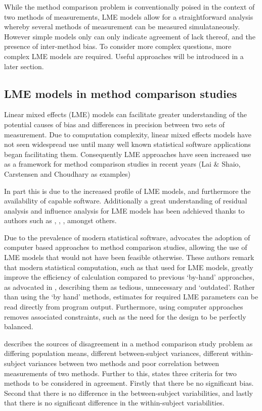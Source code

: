 \documentclass[12pt, a4paper]{report}
\theoremstyle{plain}
\theoremstyle{definition}
\theoremstyle{remark}
\begin{document}
	While the method comparison problem is conventionally poised in the context of two methods of measurements, LME models allow for a straightforward analysis whereby several methods of measurement can be measured simulataneously. However simple models only can only indicate agreement of lack thereof, and the presence of inter-method bias. To consider more complex questions, more complex LME models are required.  Useful approaches will be introduced in a later section.
	
	
	
	\subsection{LME models in method comparison studies}
 Linear mixed effects (LME) models can facilitate greater understanding of the potential causes of bias and differences in precision between two sets of measurement. Due to computation complexity, linear mixed effects models have not seen widespread use until many well known statistical software applications began facilitating them. Consequently LME approaches have seen increased use as a framework for method comparison studies in recent years (Lai $\&$ Shaio, Carstensen and Choudhary as examples)
 
 
 In part this is due to the increased profile of LME models, and furthermore the availability of capable software. 	Additionally a great understanding of residual analysis and influence analysis for LME models has been adchieved thanks to authors such as \citet{schabenberger}, \citet{Christensen}, \citet{cook86} \citet{west}, amongst others.
 
 
 Due to the prevalence of modern statistical software, \citet{BXC2008} advocates the adoption of computer based approaches to method comparison studies, allowing the use of LME models that would not have been feasible otherwise. These authors remark that modern statistical computation, such as that used for LME models, greatly improve the efficiency of
	calculation compared to previous `by-hand' approaches, as advocated in \citet{BA99}, describing them as tedious, unnecessary and `outdated'. Rather than using the `by hand' methods, estimates for required LME parameters can be read directly from program output. Furthermore, using computer approaches removes associated constraints, such as the need for the design to be perfectly balanced.
	
	
	
	
	
	\citet{Barnhart} describes the sources of disagreement in a method comparison study problem as
	differing population means, different between-subject variances, different within-subject variances between two methods and poor
	correlation between measurements of two methods. Further to this, \citet{ARoy2009} states three criteria for two methods to be considered in agreement. Firstly that there be no significant bias. Second that there is no difference in the between-subject variabilities, and lastly that there is no significant difference in the within-subject variabilities. 	
	
\end{document}
